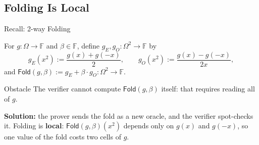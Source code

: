 \documentclass{zkdl-presentation-template}
\begin{document}
    \subsection{Folding Is Local}

    \begin{frame}{Recall: 2-way Folding}
        \begin{definition}
            For $g: \Omega \to \mathbb{F}$ and $\beta \in \mathbb{F}$, define $g_E, g_O: \Omega^2 \to \mathbb{F}$ by
            \begin{equation*}
                g_E(x^2) := \frac{g(x) + g(-x)}{2}, \qquad g_O(x^2) := \frac{g(x) - g(-x)}{2x},
            \end{equation*}
            and $\mathsf{Fold}(g, \beta) := g_E + \beta \cdot g_O: \Omega^2 \to \mathbb{F}$.
        \end{definition}
        \pause

        \begin{alertblock}{Obstacle}
            The verifier cannot compute $\mathsf{Fold}(g, \beta)$ itself: that requires reading all of $g$.
        \end{alertblock}
        \pause

        \textbf{Solution:} the prover sends the fold as a new oracle, and the verifier spot-checks it. Folding is \textbf{local}: $\mathsf{Fold}(g, \beta)(x^2)$ depends only on $g(x)$ and $g(-x)$, so one value of the fold costs two cells of $g$.
    \end{frame}
\end{document}

